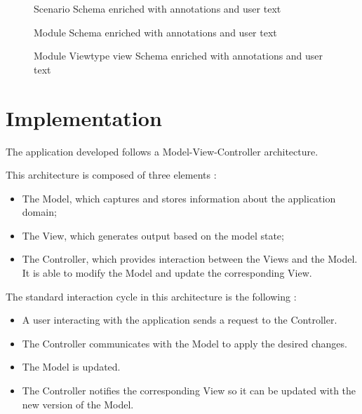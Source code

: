 \documentclass{llncs}
\begin{document}
\begin{figure}
\centering

\caption{Scenario Schema enriched with annotations and user text}
\label{figure:scenarioTemplate2}
\end{figure}

\begin{figure}
\centering

\caption{Module Schema enriched with annotations and user text}
\label{figure:moduleTemplate2}
\end{figure}

\begin{figure}
\centering

\caption{Module Viewtype view Schema enriched with annotations and user text}
\label{figure:viewTemplate2}
\end{figure}


\section{Implementation}
\label{implementation}

The application developed follows a Model-View-Controller architecture.

This architecture is composed of three elements \cite{krasner1988description}:
\begin{itemize}
\item The Model, which captures and stores information about the application domain;
\item The View, which generates output based on the model state;
\item The Controller, which provides interaction between the Views and the Model. It is able to modify the Model and update the corresponding View.
\end{itemize}

The standard interaction cycle in this architecture is the following \cite{krasner1988description,reenskaug2009dci}:
\begin{itemize}
\item A user interacting with the application sends a request to the Controller.

\item The Controller communicates with the Model to apply the desired changes.

\item The Model is updated.

\item The Controller notifies the corresponding View so it can be updated with the new version of the Model.
\end{itemize}
\end{document}
